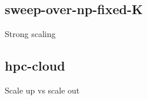 \subsection{sweep-over-np-fixed-K}
Strong scaling

\begin{figure}[t] %
  \centering
  \label{fig-ppx-cpu}
\end{figure}

\subsection{hpc-cloud}
Scale up vs scale out
\begin{figure}[t] %
  \centering
  \label{fig-ppx-cpu}
\end{figure}

